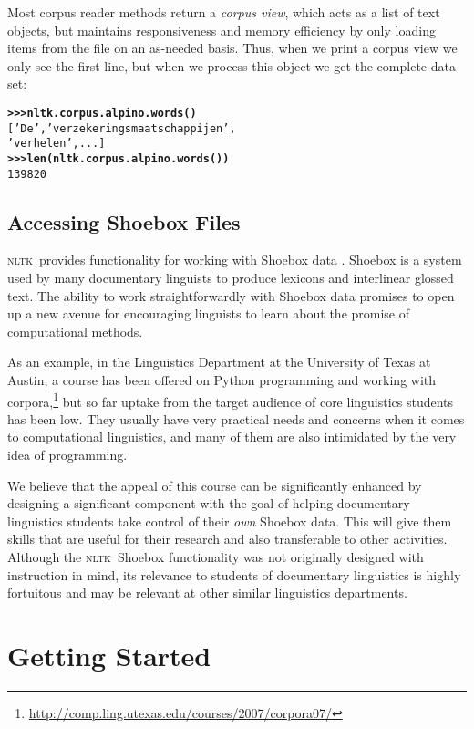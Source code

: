 \documentclass[11pt]{article}
\newcommand{\NLTK}{\textsc{nltk}}
\begin{document}
Most corpus reader methods return a \emph{corpus view}, which acts as
a list of text objects, but maintains responsiveness and memory
efficiency by only loading items from the file on an as-needed basis.
Thus, when we print a corpus view we only see the first line, but when
we process this object we get the complete data set:

{\footnotesize
\begin{alltt}
\textbf{>>> nltk.corpus.alpino.words()}
['De', 'verzekeringsmaatschappijen',
'verhelen', ...]
\textbf{>>> len(nltk.corpus.alpino.words())}
139820
\end{alltt}}

\subsection{Accessing Shoebox Files}

\NLTK\ provides functionality for working with Shoebox data
\cite{Robinson07}. Shoebox is a system used by many
documentary linguists to produce lexicons and interlinear glossed text.  The
ability to work straightforwardly with Shoebox data promises to open
up a new avenue for encouraging linguists to learn about the promise
of computational methods. 

As an example, in the Linguistics Department at the University of
Texas at Austin, a course has been offered on Python programming and
working with
corpora,\footnote{\url{http://comp.ling.utexas.edu/courses/2007/corpora07/}}
but so far uptake from the target audience of core linguistics
students has been low. They usually have very practical needs and
concerns when it comes to computational linguistics, and many of them
are also intimidated by the very idea of programming.

We believe that the appeal of this course can be significantly
enhanced by designing a significant component
with the goal of helping documentary linguistics students take control of their
\emph{own} Shoebox data. This will give them  skills that are
useful for their research and also transferable to other activities.
Although the \NLTK\ Shoebox functionality was not
originally designed with instruction in mind, its relevance to
students of documentary linguistics is highly fortuitous and
may be relevant at other similar linguistics departments.

\section{Getting Started}
\label{sec:getting-started}
\end{document}
